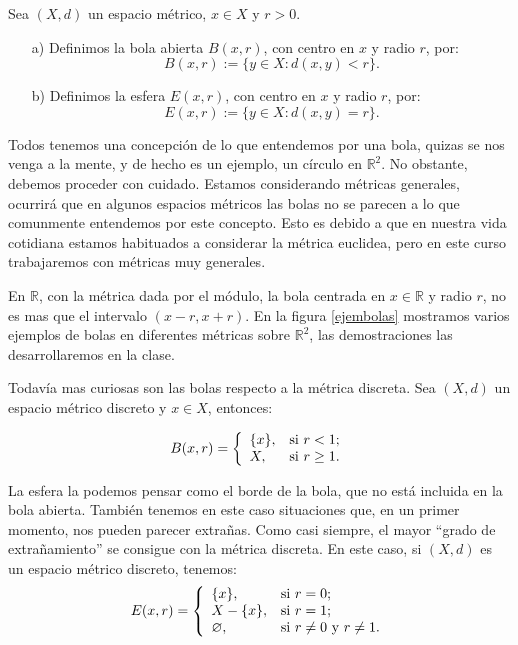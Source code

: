 \begin{definicion}{} Sea $(X,d)$ un espacio métrico, $x\in X$ y
$r>0$.
\begin{itemize}
\item[a)]Definimos la bola abierta $B(x,r)$, con centro en $x$ y radio
$r$, por:
\[B(x,r):=\{y\in X:d(x,y)<r\}.\]
\item[b)]Definimos la esfera $E(x,r)$, con centro en $x$ y radio
$r$, por:
\[E(x,r):=\{y\in X:d(x,y)=r\}.\]
\end{itemize}
\end{definicion}

Todos tenemos una concepción de lo que entendemos por una bola,
quizas se nos venga a la mente, y de hecho es un ejemplo, un
círculo en $\mathbb{R}^2$. No obstante, debemos proceder con
cuidado. Estamos considerando métricas generales, ocurrirá que
en algunos espacios métricos las  bolas no se parecen a lo
que comunmente entendemos por este concepto. Esto es debido a que
en nuestra vida cotidiana estamos habituados a considerar la
métrica euclidea, pero en este curso trabajaremos con métricas
muy generales.

En $\mathbb{R}$, con la métrica dada por el módulo, la bola
centrada en $x\in\mathbb{R}$ y radio $r$, no es mas que el
intervalo $(x-r,x+r)$. En la figura \vref{ejembolas}  mostramos
varios ejemplos de bolas en diferentes métricas sobre
$\mathbb{R}^2$, las demostraciones las desarrollaremos en la
clase.


Todavía mas curiosas son las bolas respecto a la métrica
discreta. Sea $(X,d)$ un espacio métrico discreto y $x\in X$,
entonces:

\[B(x,r)=\left\{
\begin{array}{ll}
	\{x\}, & \hbox{si $r<1$;} \\
	X, & \hbox{si $r\geq 1$.} \\
\end{array}
\right.
\]

La esfera la podemos pensar como el borde de la bola, que no
está incluida en la bola abierta. También tenemos en este caso
situaciones que, en un primer momento, nos pueden parecer
extra\~nas. Como casi siempre, el mayor ``grado de
extra\~namiento'' se consigue con la métrica discreta. En este
caso, si $(X,d)$ es un espacio métrico discreto, tenemos:
\[E(x,r)=\left\{
\begin{array}{ll}
	\{x\}, & \hbox{si $r=0$;} \\
	X-\{x\}, & \hbox{si $r=1$;} \\
	\emptyset, & \hbox{si $r\neq 0$ y $r\neq 1$.} \\
\end{array}
\right.
\]

